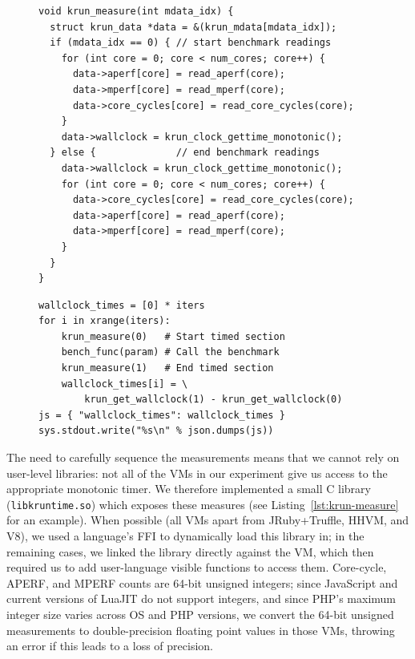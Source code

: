 \documentclass[acmlarge]{acmart}\settopmatter{printfolios=true}
\begin{document}
\begin{figure}[t]
\begin{lstlisting}[label=lst:krun-measure, xleftmargin=0cm,
        caption={%
\texttt{krun\_measure}: Measuring before (the \texttt{if}'s true branch) and
after (its false branch) a benchmark. Since
wall-clock time is the most important measure, it is innermost; since
the APERF/MPERF counters are a sanity check, they are outermost. Note that
the APERF/MPERF counters must be read in the same order before
and after a benchmark.}]
void krun_measure(int mdata_idx) {
  struct krun_data *data = &(krun_mdata[mdata_idx]);
  if (mdata_idx == 0) { // start benchmark readings
    for (int core = 0; core < num_cores; core++) {
      data->aperf[core] = read_aperf(core);
      data->mperf[core] = read_mperf(core);
      data->core_cycles[core] = read_core_cycles(core);
    }
    data->wallclock = krun_clock_gettime_monotonic();
  } else {              // end benchmark readings
    data->wallclock = krun_clock_gettime_monotonic();
    for (int core = 0; core < num_cores; core++) {
      data->core_cycles[core] = read_core_cycles(core);
      data->aperf[core] = read_aperf(core);
      data->mperf[core] = read_mperf(core);
    }
  }
}
\end{lstlisting}
\end{figure}

\begin{figure}[t]
\begin{lstlisting}[label=lst:pyiter, caption={An elided version of the Python
in-process iterations runner (with core cycles etc. removed).}]
wallclock_times = [0] * iters
for i in xrange(iters):
    krun_measure(0)   # Start timed section
    bench_func(param) # Call the benchmark
    krun_measure(1)   # End timed section
    wallclock_times[i] = \
        krun_get_wallclock(1) - krun_get_wallclock(0)
js = { "wallclock_times": wallclock_times }
sys.stdout.write("%s\n" % json.dumps(js))
\end{lstlisting}
\end{figure}

The need to carefully sequence the measurements means that we cannot rely
on user-level libraries: not all of the VMs in our experiment give us access to
the appropriate monotonic timer. We therefore
implemented a small C library (\texttt{libkruntime.so}) which exposes these
measures (see Listing~\ref{lst:krun-measure} for an example). When possible
(all VMs apart from JRuby+Truffle, HHVM, and V8), we used a language's FFI to dynamically load this library
in; in the remaining cases, we linked the library directly against the VM, which
then required us to add user-language visible functions to access them.
Core-cycle, APERF, and MPERF counts are 64-bit unsigned integers; since
JavaScript and current versions of LuaJIT do not support
integers, and since PHP's maximum integer size varies across OS and PHP versions, we
convert the 64-bit unsigned measurements to
double-precision floating point values in those VMs, throwing an error if this leads to a
loss of precision.
\end{document}
